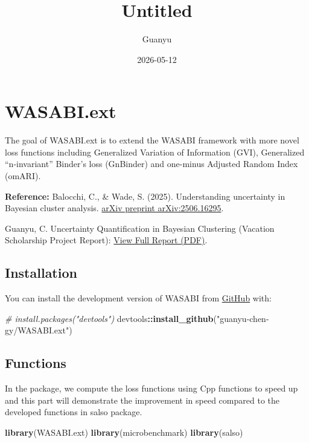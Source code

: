 \documentclass[
]{article}
\title{Untitled}
\author{Guanyu}
\date{2026-05-12}
\newenvironment{Shaded}{\begin{snugshade}}{\end{snugshade}}
\newcommand{\CommentTok}[1]{\textcolor[rgb]{0.56,0.35,0.01}{\textit{#1}}}
\newcommand{\FunctionTok}[1]{\textcolor[rgb]{0.13,0.29,0.53}{\textbf{#1}}}
\newcommand{\NormalTok}[1]{#1}
\newcommand{\SpecialCharTok}[1]{\textcolor[rgb]{0.81,0.36,0.00}{\textbf{#1}}}
\newcommand{\StringTok}[1]{\textcolor[rgb]{0.31,0.60,0.02}{#1}}
\begin{document}
\maketitle

\section{WASABI.ext}\label{wasabi.ext}

The goal of WASABI.ext is to extend the WASABI framework with more novel
loss functions including Generalized Variation of Information (GVI),
Generalized ``n-invariant'' Binder's loss (GnBinder) and one-minus
Adjusted Random Index (omARI).

\textbf{Reference:} Balocchi, C., \& Wade, S. (2025). Understanding
uncertainty in Bayesian cluster analysis.
\href{https://arxiv.org/abs/2506.16295v1}{arXiv preprint
arXiv:2506.16295}.

Guanyu, C. Uncertainty Quantification in Bayesian Clustering (Vacation
Scholarship Project Report): \href{report/Report.pdf}{View Full Report
(PDF)}.

\subsection{Installation}\label{installation}

You can install the development version of WASABI from
\href{https://github.com/}{GitHub} with:

\begin{Shaded}
\begin{Highlighting}[]
\CommentTok{\# install.packages("devtools")}
\NormalTok{devtools}\SpecialCharTok{::}\FunctionTok{install\_github}\NormalTok{(}\StringTok{"guanyu{-}chen{-}gy/WASABI.ext"}\NormalTok{)}
\end{Highlighting}
\end{Shaded}

\subsection{Functions}\label{functions}

In the package, we compute the loss functions using Cpp functions to
speed up and this part will demonstrate the improvement in speed
compared to the developed functions in salso package.

\begin{Shaded}
\begin{Highlighting}[]
\FunctionTok{library}\NormalTok{(WASABI.ext)}
\FunctionTok{library}\NormalTok{(microbenchmark)}
\FunctionTok{library}\NormalTok{(salso)}
\end{Highlighting}
\end{Shaded}
\end{document}

